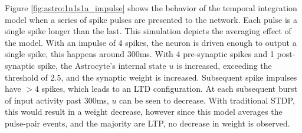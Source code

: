     Figure \ref{fig:astro:1n1s1a_impulse} shows the behavior of the temporal
    integration model when a series of spike pulses are presented to the
    network. Each pulse is a single spike longer than the last. This simulation
    depicts the averaging effect of the model. With an impulse of 4 spikes, the
    neuron is driven enough to output a single spike, this happens around
    300ms. With 4 pre-synaptic spikes and 1 post-synaptic spike, the Astrocyte's
    internal state $u$ is increased, exceeding the threshold of $2.5$, and the
    synaptic weight is increased. Subsequent spike impulses have $>4$ spikes,
    which leads to an LTD configuration. At each subsequent burst of input
    activity past 300ms, $u$ can be seen to decrease. With traditional STDP,
    this would result in a weight decrease, however since this model averages
    the pulse-pair events, and the majority are LTP, no decrease in weight is
    observed.

    


    
    
